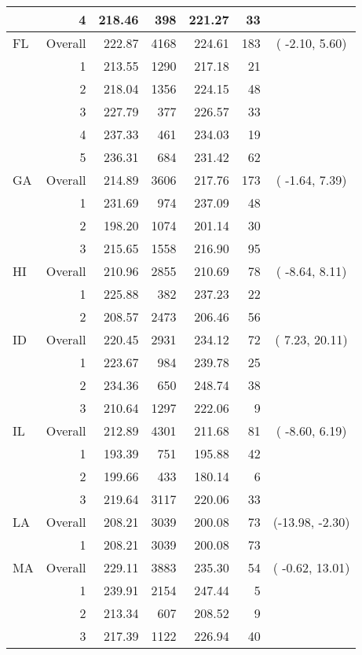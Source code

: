 \begin{longtable}{lrrr@{\extracolsep{.25cm}}rrc}
   & 4 & 218.46 & 398 & 221.27 &  33 &  \\ 
   \hline
FL & Overall & 222.87 & 4168 & 224.61 & 183 & ( -2.10,   5.60) \\ 
   & 1 & 213.55 & 1290 & 217.18 &  21 &  \\ 
   & 2 & 218.04 & 1356 & 224.15 &  48 &  \\ 
   & 3 & 227.79 & 377 & 226.57 &  33 &  \\ 
   & 4 & 237.33 & 461 & 234.03 &  19 &  \\ 
   & 5 & 236.31 & 684 & 231.42 &  62 &  \\ 
   \hline
GA & Overall & 214.89 & 3606 & 217.76 & 173 & ( -1.64,   7.39) \\ 
   & 1 & 231.69 & 974 & 237.09 &  48 &  \\ 
   & 2 & 198.20 & 1074 & 201.14 &  30 &  \\ 
   & 3 & 215.65 & 1558 & 216.90 &  95 &  \\ 
   \hline
HI & Overall & 210.96 & 2855 & 210.69 &  78 & ( -8.64,   8.11) \\ 
   & 1 & 225.88 & 382 & 237.23 &  22 &  \\ 
   & 2 & 208.57 & 2473 & 206.46 &  56 &  \\ 
   \hline
ID & Overall & 220.45 & 2931 & 234.12 &  72 & (  7.23,  20.11) \\ 
   & 1 & 223.67 & 984 & 239.78 &  25 &  \\ 
   & 2 & 234.36 & 650 & 248.74 &  38 &  \\ 
   & 3 & 210.64 & 1297 & 222.06 &   9 &  \\ 
   \hline
IL & Overall & 212.89 & 4301 & 211.68 &  81 & ( -8.60,   6.19) \\ 
   & 1 & 193.39 & 751 & 195.88 &  42 &  \\ 
   & 2 & 199.66 & 433 & 180.14 &   6 &  \\ 
   & 3 & 219.64 & 3117 & 220.06 &  33 &  \\ 
   \hline
LA & Overall & 208.21 & 3039 & 200.08 &  73 & (-13.98,  -2.30) \\ 
   & 1 & 208.21 & 3039 & 200.08 &  73 &  \\ 
   \hline
MA & Overall & 229.11 & 3883 & 235.30 &  54 & ( -0.62,  13.01) \\ 
   & 1 & 239.91 & 2154 & 247.44 &   5 &  \\ 
   & 2 & 213.34 & 607 & 208.52 &   9 &  \\ 
   & 3 & 217.39 & 1122 & 226.94 &  40 &  \\ 
   \hline

\end{longtable}
